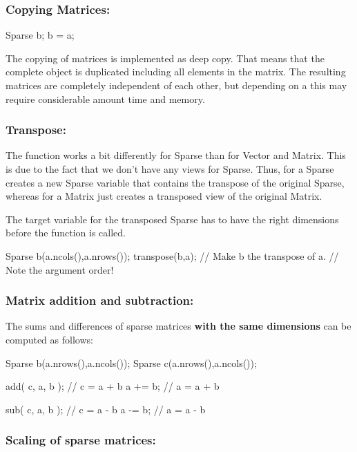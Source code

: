\subsubsection{Copying Matrices:}
\begin{code}
Sparse b;
b = a;
\end{code}
%
The copying of matrices is implemented as deep copy. That means that the complete
object is duplicated including all elements in the matrix. The resulting matrices
are completely independent of each other, but depending on a this may require
considerable amount time and memory.

\subsubsection{Transpose:} The function  works a bit
differently for Sparse than for Vector and Matrix. This is due to the
fact that we don't have any views for Sparse. Thus,
 for a Sparse creates a new Sparse variable that
contains the transpose of the original Sparse, whereas
 for a Matrix just creates a transposed view of
the original Matrix.

The target variable for the transposed Sparse has to have the right
dimensions before the function is called.
\begin{code}
Sparse b(a.ncols(),a.nrows());
transpose(b,a);     // Make b the transpose of a.
                    // Note the argument order!
\end{code}

\subsubsection{Matrix addition and subtraction:}

The sums and differences of sparse matrices \textbf{with the same
dimensions} can be computed as follows:
%
\begin{code}
Sparse b(a.nrows(),a.ncols());
Sparse c(a.nrows(),a.ncols());

add( c, a, b ); // c = a + b
a += b;       // a = a + b

sub( c, a, b ); // c = a - b
a -= b;       // a = a - b
\end{code}
%

\subsubsection{Scaling of sparse matrices:}

